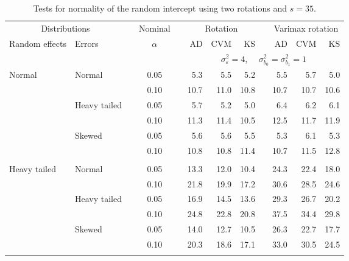 \begin{table}[ht]
\caption{\label{tab:simb0s35-alt}Tests for normality of the random intercept using two rotations and $s = 35$.}
\begin{scriptsize}
\begin{center}
\begin{tabular}{ll p{.1cm} c p{.1cm} rrr p{.1cm} rrr}
  \hline
  \multicolumn{2}{c}{Distributions}& & Nominal & &  \multicolumn{3}{c}{Rotation} & & \multicolumn{3}{c}{Varimax rotation} \\ \cline{1-2} \cline{6-8} \cline{10-12}   
  Random effects & Errors & & $\alpha$ & & AD & CVM & KS & & AD & CVM & KS \\ 
   \hline
& && && \multicolumn{7}{c}{$\sigma_{\varepsilon}^2 = 4$, \ \ $\sigma_{b_0}^2 = \sigma_{b_1}^2 = 1$} \\ \cline{6-12}
\rowcolor{gray!20}Normal       & Normal       && 0.05 &&   5.3 & 5.5 & 5.2 &   & 5.5 & 5.7 & 5.0 \\ 
\rowcolor{gray!20}             &              && 0.10 &&   10.7 & 11.0 & 10.8 &   & 10.7 & 10.7 & 10.6 \\ 
\rowcolor{gray!20}             & Heavy tailed && 0.05 &&   5.7 & 5.2 & 5.0 &   & 6.4 & 6.2 & 6.1 \\ 
\rowcolor{gray!20}             &              && 0.10 &&   11.3 & 11.4 & 10.5 &   & 12.5 & 11.7 & 11.9 \\ 
\rowcolor{gray!20}             & Skewed       && 0.05 &&   5.6 & 5.6 & 5.5 &   & 5.3 & 6.1 & 5.3 \\ 
\rowcolor{gray!20}             &              && 0.10 &&   10.8 & 10.8 & 11.4 &   & 10.7 & 11.5 & 12.8 \\ 
&&&&&&&&&&&\\
Heavy tailed & Normal       && 0.05 &&   13.3 & 12.0 & 10.4 &   & 24.3 & 22.4 & 18.0 \\ 
             &              && 0.10 &&   21.8 & 19.9 & 17.2 &   & 30.6 & 28.5 & 24.6 \\ 
             & Heavy tailed && 0.05 &&   16.9 & 14.5 & 13.6 &   & 29.3 & 26.7 & 20.2 \\ 
             &              && 0.10 &&   24.8 & 22.8 & 20.8 &   & 37.5 & 34.4 & 29.8 \\ 
             & Skewed       && 0.05 &&   14.0 & 12.7 & 10.5 &   & 26.3 & 22.7 & 17.7 \\ 
             &              && 0.10 &&   20.3 & 18.6 & 17.1 &   & 33.0 & 30.5 & 24.5 \\ 
&&&&&&&&&&&\\

\end{tabular}
\end{center}
\end{scriptsize}
\end{table}
